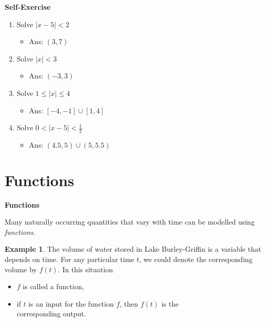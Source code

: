 \documentclass[t]{beamer}
\theoremstyle{plain}
\theoremstyle{definition}
\newtheorem{ex}{Example}[section]
\newcounter{heading}
\newcommand{\makeheading}[1]{\medskip\begin{large}\noindent\textbf{{#1}}\end{large}\smallskip}
\begin{document}
\begin{frame}
\makeheading{Self-Exercise}

\begin{enumerate}
\item Solve $|x - 5| < 2$ 
\begin{itemize}
	\item Ans: $(3, 7)$
\end{itemize}

\item Solve $|x| < 3$ 
\begin{itemize}
	\item Ans: $(-3, 3)$
\end{itemize}

\item Solve $1 \leq |x| \leq 4$ 
 \begin{itemize}
	\item Ans: $[-4, -1] \cup [1, 4]$
\end{itemize}

\item  Solve $0 < |x - 5| < \frac{1}{2}$ 
\begin{itemize}
	\item Ans: $(4.5, 5) \cup (5, 5.5) $
\end{itemize}
\end{enumerate}

\end{frame}

\section{Functions}
\begin{frame}
\makeheading{Functions}

Many naturally occurring quantities that vary with time can be modelled using \textit{functions}.\\
\begin{ex} The volume of water stored in Lake Burley-Griffin is a variable that depends on time. For any particular time $t$, we could denote the corresponding volume by $f(t)$. In this situation
\begin{itemize}
\item $f$ is called a function,
\item if $t$ is an input for the function $f$, then $f(t)$ is the\\ corresponding output.
\end{itemize}
\end{ex}

\end{frame}
\end{document}
